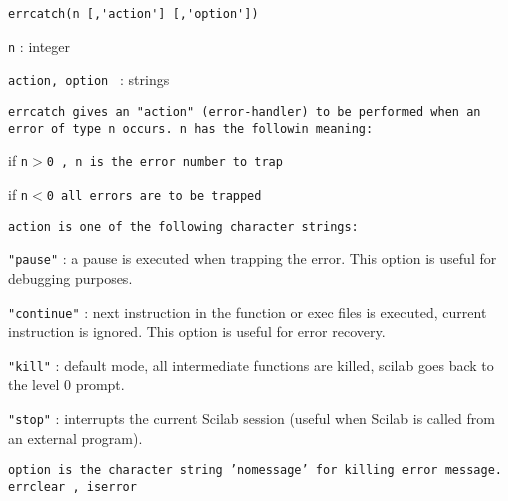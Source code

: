 


%
%


\label{errcatch}

\begin{verbatim}
errcatch(n [,'action'] [,'option']) 
\end{verbatim}
\begin{scitem}
\item[{\tt n}]
: integer 
\item[{\tt action, option }]
: strings
\end{scitem}%
%
\tt errcatch %
\rm gives an "action" (error-handler)  to be 
performed when an error of type %
\tt n %
\rm occurs.
%
\tt n %
\rm has the followin meaning:
\par
if %
\tt n$>$0%
\rm , %
\tt n %
\rm is the error number to trap
\par
if %
\tt n$<$0 %
\rm  all errors are to be trapped
\par\noindent
%
\tt action %
\rm is one of the following character strings:
\begin{scitem}
\item[{\tt "pause"}]
: a pause is executed when trapping the error. This option is useful
for debugging purposes.
\item[{\tt "continue"}]
: next instruction in the function or exec files is executed, current
instruction is ignored. This option is useful for error recovery.
\item[{\tt "kill"}]
: default mode, all intermediate functions are killed, scilab goes
back to the level 0 prompt.
\item[{\tt "stop"}]
: interrupts the current Scilab session (useful when 
Scilab is called from an external program).
\end{scitem}%
\par\noindent
%
\tt option %
\rm is the character string %
\tt 'nomessage' %
\rm for killing
error message.
{\verb?errclear?} \pageref{errclear},{\verb? iserror?} \pageref{iserror}

